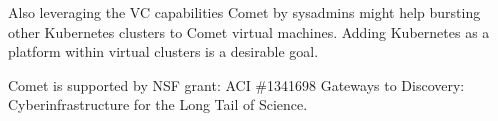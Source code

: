 \documentclass[sigconf,hyphens]{acmart}
\begin{document}
Also leveraging the VC capabilities Comet by sysadmins might help
bursting other Kubernetes clusters to Comet virtual machines. Adding
Kubernetes as a platform within virtual clusters is a desirable goal.

\begin{acks}

  Comet is supported by NSF grant: ACI \#1341698 Gateways to
  Discovery: Cyberinfrastructure for the Long Tail of Science.

\end{acks}



\end{document}

